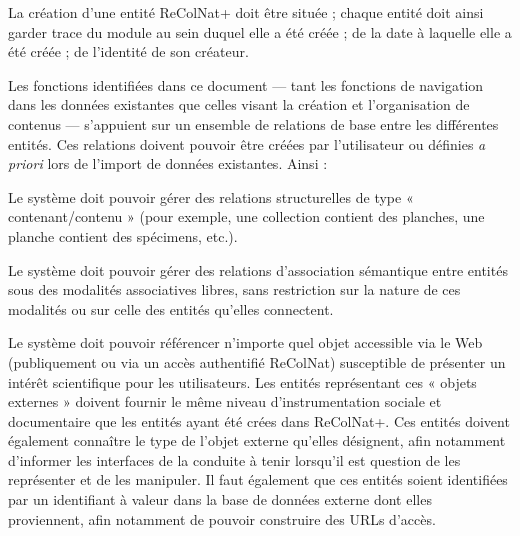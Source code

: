 \startsection[title={Propriétés générales des entités}]

La création d'une entité ReColNat+ doit être située ; chaque entité doit ainsi garder trace du module au sein duquel elle a été créée ; de la date à laquelle elle a été créée ; de l'identité de son créateur.

\startsection[title={Relations entre entités},reference=s:entites:relations]

Les fonctions identifiées dans ce document --- tant les fonctions de navigation dans les données existantes que celles visant la création et l'organisation de contenus --- s'appuient sur un ensemble de relations de base entre les différentes entités.
Ces relations doivent pouvoir être créées par l'utilisateur ou définies {\it a priori} lors de l'import de données existantes.
Ainsi :

\startitemize
	\item
	Le système doit pouvoir gérer des relations structurelles de type « contenant/contenu » (pour exemple, une collection contient des planches, une planche contient des spécimens, etc.).
	\item
	Le système doit pouvoir gérer des relations d'association sémantique entre entités sous des modalités associatives libres, sans restriction sur la nature de ces modalités ou sur celle des entités qu'elles connectent.
	\item
	Le système doit pouvoir référencer n'importe quel objet accessible via le Web (publiquement ou via un accès authentifié ReColNat) susceptible de présenter un intérêt scientifique pour les utilisateurs.
	Les entités représentant ces « objets externes » doivent fournir le même niveau d'instrumentation sociale et documentaire que les entités ayant été crées dans ReColNat+.
	Ces entités doivent également connaître le type de l'objet externe qu'elles désignent, afin notamment d'informer les interfaces de la conduite à tenir lorsqu'il est question de les représenter et de les manipuler.
	Il faut également que ces entités soient identifiées par un identifiant à valeur dans la base de données externe dont elles proviennent, afin notamment de pouvoir construire des URLs d'accès.
\stopitemize

